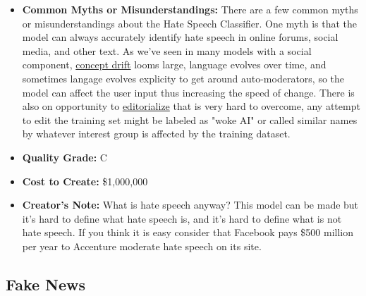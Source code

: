 \begin{itemize}
    \item \textbf{Common Myths or Misunderstandings:} There are a few common myths or misunderstandings about the Hate Speech Classifier. One myth is that the model can always accurately identify hate speech in online forums, social media, and other text. As we've seen in many models with a social component, \hyperref[sec:drift]{concept drift} looms large, language evolves over time, and sometimes langage evolves explicity to get around auto-moderators, so the model can affect the user input thus increasing the speed of change. There is also on opportunity to \hyperref[sec:janitor]{editorialize} that is very hard to overcome, any attempt to edit the training set might be labeled as "woke AI" or called similar names by whatever interest group is affected by the training dataset.  
    \item \textbf{Quality Grade:} C
    \item \textbf{Cost to Create:} \$1,000,000
    \item \textbf{Creator's Note:} What is hate speech anyway? This model can be made but it's hard to define what hate speech is, and it's hard to define what is not hate speech. If you think it is easy consider that Facebook pays \$500 million per year to Accenture moderate hate speech on its site.
\end{itemize}

\subsection{Fake News}

